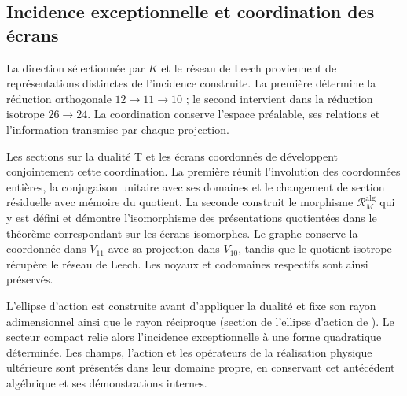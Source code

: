 \subsection{Incidence exceptionnelle et coordination des écrans}
\label{exc:pantallas-dualidad}

La direction sélectionnée par \(K\) et le réseau de Leech proviennent
de représentations distinctes de l’incidence construite. La première
détermine la réduction orthogonale \(12\to11\to10\) ; le second
intervient dans la réduction isotrope \(26\to24\). La coordination
conserve l’espace préalable, ses relations et l’information transmise
par chaque projection.

Les sections sur la dualité T et les écrans coordonnés de \cite{hmtX} développent conjointement cette coordination. La première réunit l'involution des coordonnées entières, la conjugaison unitaire avec ses domaines et le changement de section résiduelle avec mémoire du quotient. La seconde construit le morphisme \(\mathcal R_M^{\mathrm{alg}}\) qui y est défini et démontre l'isomorphisme des présentations quotientées dans le théorème correspondant sur les écrans isomorphes. Le graphe conserve la coordonnée dans \(V_{11}\) avec sa projection dans \(V_{10}\), tandis que le quotient isotrope récupère le réseau de Leech. Les noyaux et codomaines respectifs sont ainsi préservés.

L’ellipse d’action est construite avant d’appliquer la dualité et fixe
son rayon adimensionnel ainsi que le rayon réciproque
(section de l’ellipse d’action de \cite{hmtX}). Le secteur compact relie alors
l’incidence exceptionnelle à une forme quadratique déterminée. Les
champs, l’action et les opérateurs de la réalisation physique ultérieure
sont présentés dans leur domaine propre, en conservant cet antécédent
algébrique et ses démonstrations internes.
